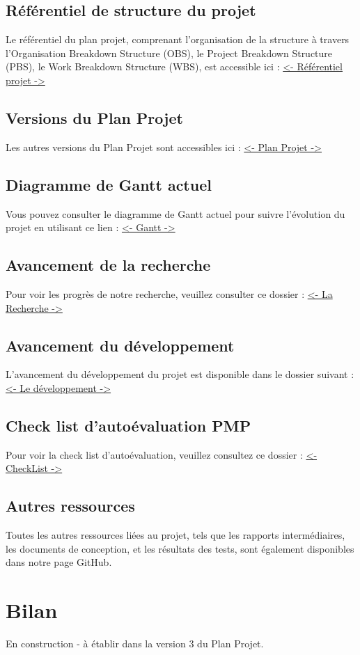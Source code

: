 \documentclass[11pt]{rapport_class}
\begin{document}
\section{Référentiel de structure du projet}
\label{referentiel projet}
\qquad Le référentiel du plan projet, comprenant l'organisation de la structure à travers l'Organisation Breakdown Structure (OBS), le Project Breakdown Structure (PBS), le Work Breakdown Structure (WBS), est accessible ici :
\href{https://github.com/fghjklm/Projet_M1_CheckThat-/tree/main/referentiel_projet}{<- Référentiel projet ->}

\section{Versions du Plan Projet}
\qquad Les autres versions du Plan Projet sont accessibles ici :
\href{https://github.com/fghjklm/Projet_M1_CheckThat-/tree/main/plan_projet}{<- Plan Projet ->}

\section{Diagramme de Gantt actuel}
\qquad Vous pouvez consulter le diagramme de Gantt actuel pour suivre l'évolution du projet en utilisant ce lien :
\href{https://github.com/fghjklm/Projet_M1_CheckThat-/tree/main/gantt}{<- Gantt ->}

\section{Avancement de la recherche}
\qquad Pour voir les progrès de notre recherche, veuillez consulter ce dossier :
\href{https://github.com/fghjklm/Projet_M1_CheckThat-/tree/main/articles}{<- La Recherche ->}

\section{Avancement du développement}
\qquad L'avancement du développement du projet est disponible dans le dossier suivant :
\href{https://github.com/fghjklm/Projet_M1_CheckThat-/tree/main/code}{<- Le développement ->}

\section{Check list d'autoévaluation PMP}
\qquad Pour voir la check list d'autoévaluation, veuillez consultez ce dossier : 
\href{https://github.com/fghjklm/Projet_M1_CheckThat-/tree/main/plan_projet}{<- CheckList ->}

\section{Autres ressources}
\qquad Toutes les autres ressources liées au projet, tels que les rapports intermédiaires, les documents de conception, et les résultats des tests, sont également disponibles dans notre page GitHub.


\chapter{ Bilan}
\centerline{En construction - à établir dans la version 3 du Plan Projet.}
\end{document}
